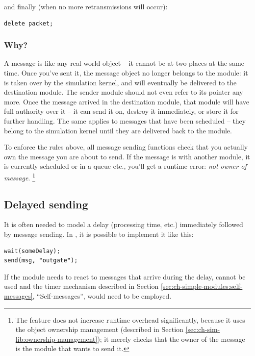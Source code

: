 and finally (when no more retransmissions will occur):

\begin{verbatim}
delete packet;
\end{verbatim}


\subsubsection{Why?}

A message is like any real world object -- it cannot be at two places
at the same time. Once you've sent it, the message object
no longer belongs to the module: it is taken over by the simulation kernel,
and will eventually be delivered to the destination module.
The sender module should not even refer to its pointer any more.
Once the message arrived in the destination module, that module
will have full authority over it -- it can send it on,
destroy it immediately, or store it for further handling.
The same applies to messages that have been scheduled -- they
belong to the simulation kernel until they are delivered back to
the module.

To enforce the rules above, all message sending functions
check that you actually own the message you are about to send.
If the message is with another module, it is currently scheduled or
in a queue etc., you'll get a runtime error: \textit{not owner of message}.
  \footnote{The feature does not increase runtime overhead significantly, because
  it uses the object ownership management (described in
  Section \ref{sec:ch-sim-lib:ownership-management});
  it merely checks that the owner of the message is the module that
  wants to send it.}



\subsection{Delayed sending}

It is often needed to model a delay (processing time, etc.) immediately
followed by message sending. In {\opp}, it is possible to implement
it like this:

\begin{verbatim}
wait(someDelay);
send(msg, "outgate");
\end{verbatim}


If the module needs to react to messages that arrive during the delay,
 cannot be used and the timer mechanism described in
Section \ref{sec:ch-simple-modules:self-messages}, ``Self-messages'', would
need to be employed.


